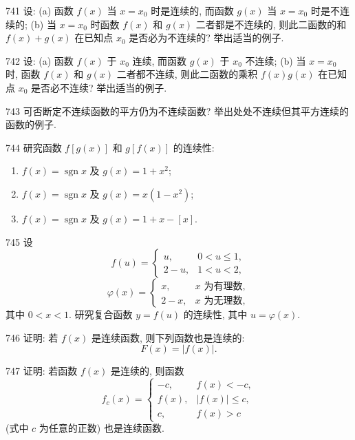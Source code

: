 \begin{prob}[M]{741}
设: (a) 函数 $f(x)$ 当 $x = x_0$ 时是连续的, 而函数 $g(x)$ 当 $x = x_0$ 时是不连续的; (b) 当 $x = x_0$ 时函数 $f(x)$ 和 $g(x)$ 二者都是不连续的, 则此二函数的和 $f(x) + g(x)$ 在已知点 $x_0$ 是否必为不连续的? 举出适当的例子.
\end{prob}

\begin{prob}[M]{742}
设: (a) 函数 $f(x)$ 于 $x_0$ 连续, 而函数 $g(x)$ 于 $x_0$ 不连续; (b) 当 $x = x_0$ 时, 函数 $f(x)$ 和 $g(x)$ 二者都不连续, 则此二函数的乘积 $f(x)g(x)$ 在已知点 $x_0$ 是否必不连续? 举出适当的例子.
\end{prob}

\begin{prob}[M]{743}
可否断定不连续函数的平方仍为不连续函数? 举出处处不连续但其平方连续的函数的例子.
\end{prob}

\begin{prob}[L]{744}
研究函数 $f[g(x)]$ 和 $g[f(x)]$ 的连续性:
\begin{enumerate}[label=(\alph*), itemsep=2pt, topsep=3pt]
\item $f(x) = \operatorname{sgn} x$ 及 $g(x) = 1 + x^2$;
\item $f(x) = \operatorname{sgn} x$ 及 $g(x) = x(1 - x^2)$;
\item $f(x) = \operatorname{sgn} x$ 及 $g(x) = 1 + x - [x]$.
\end{enumerate}
\end{prob}

\begin{prob}[M]{745}
设
\[
f(u) = \begin{cases}
u, & 0 < u \leqslant 1, \\
2 - u, & 1 < u < 2,
\end{cases}
\]
\[
\varphi(x) = \begin{cases}
x, & x \text{ 为有理数}, \\
2 - x, & x \text{ 为无理数},
\end{cases}
\]
其中 $0 < x < 1$. 研究复合函数 $y = f(u)$ 的连续性, 其中 $u = \varphi(x)$.
\end{prob}

\begin{prob}[M]{746}
证明: 若 $f(x)$ 是连续函数, 则下列函数也是连续的:
\[
F(x) = |f(x)|.
\]
\end{prob}

\begin{prob}[M]{747}
证明: 若函数 $f(x)$ 是连续的, 则函数
\[
f_c(x) = \begin{cases}
-c, & f(x) < -c, \\
f(x), & |f(x)| \leqslant c, \\
c, & f(x) > c
\end{cases}
\]
(式中 $c$ 为任意的正数) 也是连续函数.
\end{prob}

